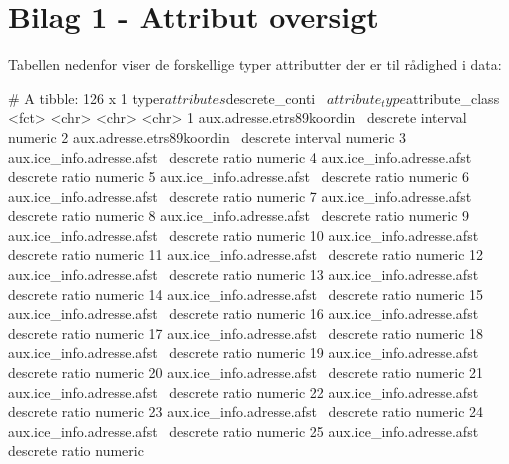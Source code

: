 \documentclass{report}
\begin{document}
\chapter{Bilag 1 - Attribut oversigt}
Tabellen nedenfor viser de forskellige typer attributter der er til rådighed i data:
\begin{Schunk}
\begin{Soutput}
# A tibble: 126 x 1
    typer$attributes           $descrete_conti~ $attribute_type $attribute_class
    <fct>                      <chr>            <chr>           <chr>           
  1 aux.adresse.etrs89koordin~ descrete         interval        numeric         
  2 aux.adresse.etrs89koordin~ descrete         interval        numeric         
  3 aux.ice_info.adresse.afst~ descrete         ratio           numeric         
  4 aux.ice_info.adresse.afst~ descrete         ratio           numeric         
  5 aux.ice_info.adresse.afst~ descrete         ratio           numeric         
  6 aux.ice_info.adresse.afst~ descrete         ratio           numeric         
  7 aux.ice_info.adresse.afst~ descrete         ratio           numeric         
  8 aux.ice_info.adresse.afst~ descrete         ratio           numeric         
  9 aux.ice_info.adresse.afst~ descrete         ratio           numeric         
 10 aux.ice_info.adresse.afst~ descrete         ratio           numeric         
 11 aux.ice_info.adresse.afst~ descrete         ratio           numeric         
 12 aux.ice_info.adresse.afst~ descrete         ratio           numeric         
 13 aux.ice_info.adresse.afst~ descrete         ratio           numeric         
 14 aux.ice_info.adresse.afst~ descrete         ratio           numeric         
 15 aux.ice_info.adresse.afst~ descrete         ratio           numeric         
 16 aux.ice_info.adresse.afst~ descrete         ratio           numeric         
 17 aux.ice_info.adresse.afst~ descrete         ratio           numeric         
 18 aux.ice_info.adresse.afst~ descrete         ratio           numeric         
 19 aux.ice_info.adresse.afst~ descrete         ratio           numeric         
 20 aux.ice_info.adresse.afst~ descrete         ratio           numeric         
 21 aux.ice_info.adresse.afst~ descrete         ratio           numeric         
 22 aux.ice_info.adresse.afst~ descrete         ratio           numeric         
 23 aux.ice_info.adresse.afst~ descrete         ratio           numeric         
 24 aux.ice_info.adresse.afst~ descrete         ratio           numeric         
 25 aux.ice_info.adresse.afst~ descrete         ratio           numeric         

\end{Soutput}
\end{Schunk}
\end{document}
